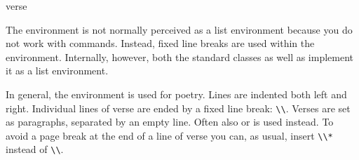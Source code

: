   \begin{Declaration}
    \begin{Environment}{verse}\end{Environment}
  \end{Declaration}%
   The
   environment is not normally perceived
  as a list environment because you do not work with  commands.
  Instead, fixed line breaks are used within the 
  environment. Internally, however, both the standard classes as well as
  {\KOMAScript} implement it as a list environment.

  In general, the  environment is used for
  poetry.  Lines are indented both left and right. Individual
  lines of verse are ended by a fixed line break: \verb|\\|. Verses are set as
  paragraphs, separated by an empty line. Often also
   or  is
  used instead. To avoid a page break at the end of a line of verse you can,
  as usual, insert \verb|\\*| instead of \verb|\\|.
